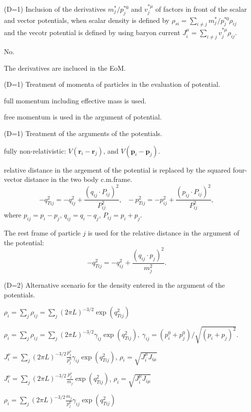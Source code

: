 \documentclass[]{article}
\newenvironment{entry}%
{\begin{list}{}{\setlength{\topsep}{0mm} \setlength{\itemsep}{0mm}
\setlength{\parskip}{0mm} \setlength{\parsep}{0mm}
\setlength{\leftmargin}{20mm} \setlength{\rightmargin}{0mm}
\setlength{\labelwidth}{18mm} \setlength{\labelsep}{2mm}}}%
{\end{list}}
\newenvironment{subentry}%
{\begin{list}{}{\setlength{\topsep}{0mm} \setlength{\itemsep}{0mm}
\setlength{\parskip}{0mm} \setlength{\parsep}{0mm}
\setlength{\leftmargin}{10mm} \setlength{\rightmargin}{0mm}
\setlength{\labelwidth}{18mm} \setlength{\labelsep}{2mm}}}%
{\end{list}}
\newcommand{\itemt}[1]{\item[{\tt #1}\hfill]}
\begin{document}
\begin{entry}

\itemt{mstc(111) :}(D=1) Inclusion of the derivatives
 $m_j^*/p^{*0}_j$ and $v_j^{*\mu}$
 of factors in front of the scalar and vector potentials,
 when scalar density is defined by 
  $\rho_{si}=\sum_{i\neq j}m_j^{*}/p_j^{*0}\rho_{ij}$
and the vecotr potential is defined by using baryon current
  $J^\mu_{i}=\sum_{i\neq j}v_j^{*\mu}\rho_{ij}$.
 \begin{subentry}
    \itemt{$=0$ :} No.
    \itemt{$=1$ :} The derivatives are incluced in the EoM.
 \end{subentry}

\itemt{mstc(112) :}(D=1) Treatment of momenta of particles
in the evaluation of potential.
 \begin{subentry}
    \itemt{$=0$ :} full momentum including effective mass is used.
    \itemt{$=1$ :} free momentum is used in the argument of potential.
 \end{subentry}

\itemt{mstc(113) :}(D=1) Treatment of the arguments of the potentials.
 \begin{subentry}
    \itemt{$=0$ :} fully non-relativistic: $V(\bm{r}_i-\bm{r}_j)$,
     and $V(\bm{p}_i-\bm{p}_j)$.
    \itemt{$=1$ :} relative distance in the argement of the potential
    is replaced by
    the squared four-vector distance 
    in the two body c.m.frame.
    \begin{equation}
    -q_{Tij}^2 = -q_{ij}^2 + \frac{(q_{ij}\cdot P_{ij})^2}{P_{ij}^2},~~~
    -p_{Tij}^2 = -p_{ij}^2 + \frac{(p_{ij}\cdot P_{ij})^2}{P_{ij}^2},
    \end{equation}
    where $p_{ij}=p_i-p_j$, 
    $q_{ij}=q_i-q_j$, 
    $P_{ij}=p_i+p_j$.
    \itemt{$=2$ :} The rest frame of particle $j$
    is used for the relative distance in the argument of
    the potential:
    $$-q_{Tij}^2 = -q_{ij}^2 + \frac{(q_{ij}\cdot p_{j})^2}{m_{j}^2}.$$
 \end{subentry}

\itemt{mstc(114) :}(D=2) Alternative scenario for the density entered 
in the argument of the potentials.
 \begin{subentry}
    \itemt{$=0$ :} $\rho_i=\sum_j \rho_{ij}
         = \sum_j (2\pi L)^{-3/2}\exp(q_{Tij}^2)$
    \itemt{$=1$ :} $\rho_i=\sum_j \rho_{ij}
         = \sum_j (2\pi L)^{-3/2}\gamma_{ij}\exp(q_{Tij}^2),~
	 \gamma_{ij}=(p_i^0+p_j^0)/\sqrt{(p_i+p_j)^2}$.
    \itemt{$=2$ :} $J^\nu_i
         = \sum_j (2\pi L)^{-3/2}\frac{p^\nu_j}{p^0_j}\gamma_{ij}
	 \exp(q_{Tij}^2)$,
	 $\rho_i=\sqrt{J_i^\mu J_{i\mu}}$
    \itemt{$=3$ :} $J^\nu_i
         = \sum_j (2\pi L)^{-3/2}\frac{p^\nu_j}{m_j} \exp(q_{Tij}^2)$,
	 $\rho_i=\sqrt{J_i^\mu J_{i\mu}}$
    \itemt{$=4$ :}
         $\rho_i= \sum_j (2\pi L)^{-3/2}\frac{m_j}{p_j^0}
	   \gamma_{ij}
	   \exp(q_{Tij}^2)$
 \end{subentry}


\end{entry}
\end{document}
